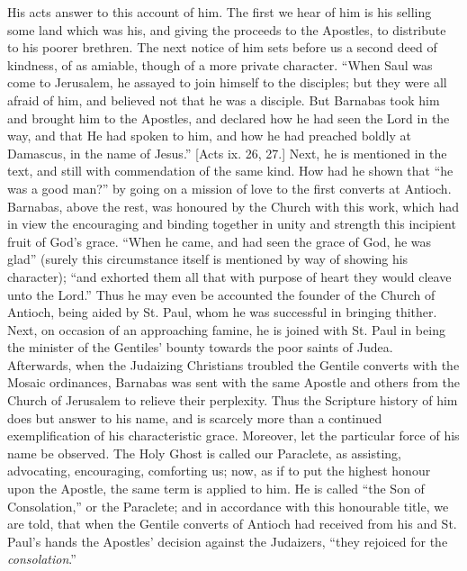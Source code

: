 His acts answer to this account of him. The first we hear of him is
his selling some land which was his, and giving the proceeds to the
Apostles, to distribute to his poorer brethren. The next notice of him
sets before us a second deed of kindness, of as amiable, though of a
more private character. ``When Saul was come to Jerusalem, he
assayed to join himself to the disciples; but they were all afraid of
him, and believed not that he was a disciple. But Barnabas took him and
brought him to the Apostles, and declared how he had seen the Lord in
the way, and that He had spoken to him, and how he had preached boldly
at Damascus, in the name of Jesus.'' [Acts ix. 26, 27.] Next, he is
mentioned in the text, and still with commendation of the same kind. How
had he shown that ``he was a good man?'' by going on a mission
of love to the first converts at Antioch. Barnabas, above the rest, was
honoured by the Church with this work, which had in view the encouraging
and binding together in unity and strength this incipient fruit of God's
grace. ``When he came, and had seen the grace of God, he was
glad'' (surely this circumstance itself is mentioned by way of
showing his character); ``and exhorted them all that with purpose of
heart they would cleave unto the Lord.'' Thus he may even be
accounted the founder of the Church of Antioch, being aided by St. Paul,
whom he was successful in bringing thither. Next, on occasion of an
approaching famine, he is joined with St. Paul in being the minister of
the Gentiles' bounty towards the poor saints of Judea. Afterwards, when
the Judaizing Christians troubled the Gentile converts with the Mosaic
ordinances, Barnabas was sent with the same Apostle and others from the
Church of Jerusalem to relieve their perplexity. Thus the Scripture
history of him does but answer to his name, and is scarcely more than a
continued exemplification of his characteristic grace. Moreover, let the
particular force of his name be observed. The Holy Ghost is called our
Paraclete, as assisting, advocating, encouraging, comforting us; now, as
if to put the highest honour upon the Apostle, the same term is applied
to him. He is called ``the Son of Consolation,'' or the
Paraclete; and in accordance with this honourable title, we are told,
that when the Gentile converts of Antioch had received from his and St.
Paul's hands the Apostles' decision against the Judaizers, ``they
rejoiced for the \emph{consolation}.''

